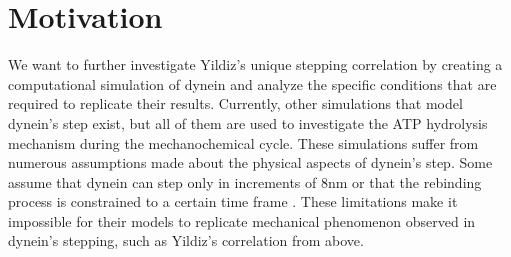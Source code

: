 \section{Motivation}

We want to further investigate Yildiz's unique stepping correlation by creating a computational simulation of dynein and analyze the specific conditions that are required to replicate their results. Currently, other simulations that model dynein's step exist, but all of them are used to investigate the ATP hydrolysis mechanism during the mechanochemical cycle. These simulations suffer from numerous assumptions made about the physical aspects of dynein's step. Some assume that dynein can step only in increments of 8nm or that the rebinding process is constrained to a certain time frame \cite{singh2005monte, trott2018mathematical}. These limitations make it impossible for their models to replicate mechanical phenomenon observed in dynein's stepping, such as Yildiz's correlation from above.

